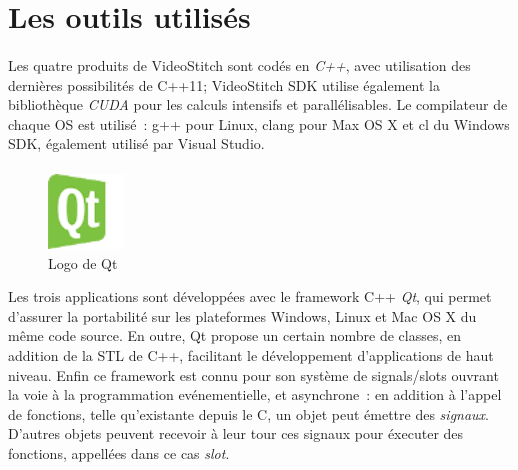 \section{Les outils utilisés}
\label{outils-utilisés}
\paragraph{}
Les quatre produits de VideoStitch sont codés en \emph{C++}, avec utilisation des dernières possibilités
de C++11; VideoStitch SDK utilise également la bibliothèque \emph{CUDA} pour les calculs intensifs et parallélisables.
Le compilateur de chaque OS est utilisé~: g++ pour Linux, clang pour Max OS X et 
cl du Windows SDK, également utilisé par Visual Studio.
\paragraph{}
\begin{figure}
  \centering
  \includegraphics[width=2cm]{images/qt-logo.png}
  \caption{Logo de Qt}
\end{figure}
Les trois applications sont  
développées avec le framework C++ \emph{Qt}, qui permet d'assurer la portabilité sur les 
plateformes Windows, Linux et Mac OS X du même code source. En outre, Qt
propose un certain nombre de classes, en addition de la STL de C++, facilitant le
développement d'applications de haut niveau. Enfin ce framework est connu pour son
système de signals/slots ouvrant la voie à la programmation evénementielle, et
asynchrone~: en addition à l'appel de fonctions, telle qu'existante depuis le C,
un objet peut émettre des \textit{signaux}. D'autres objets peuvent recevoir à leur tour
ces signaux pour éxecuter des fonctions, appellées dans ce cas \textit{slot}.\cite{qt}
